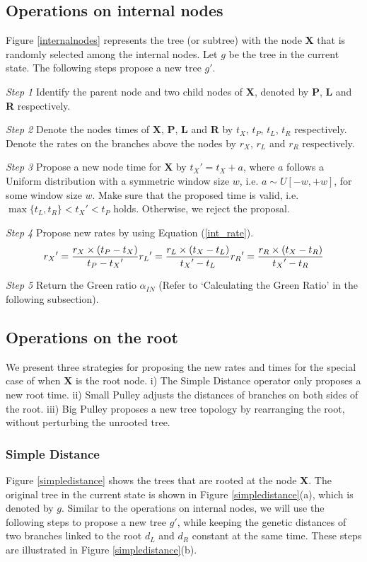 \documentclass{bmcart}
\begin{document}
\subsection*{Operations on internal nodes}
Figure \ref{internalnodes} represents the tree (or subtree) with the node \textbf{X} that is randomly selected among the internal nodes.  Let $g$ be the tree in the current state. The following steps propose a new tree ${g}'$.

\emph{Step 1} Identify the parent node and two child nodes of \textbf{X}, denoted by \textbf{P}, \textbf{L} and \textbf{R} respectively.

\emph{Step 2} Denote the nodes times of \textbf{X}, \textbf{P}, \textbf{L} and \textbf{R} by $t_X$, $t_P$, $t_L$, $t_R$ respectively. Denote the rates on the branches above the nodes by $r_X$, $r_L$ and $r_R$ respectively.

\emph{Step 3} Propose a new node time for \textbf{X} by ${t_X}' = {t_X} + a$, where $a$ follows a Uniform distribution with a symmetric window size $w$, i.e. $a \sim U[ - w, + w]$, for some window size $w$. Make sure that the proposed time is valid, i.e. $\max \{ {t_L},{t_R}\}  < {t_X}' < {t_P}$ holds. Otherwise, we reject the proposal.

\emph{Step 4} Propose new rates by using Equation (\ref{int_rate}).
\begin{equation}
 \label{int_rate}
{r_X}' = \frac{{r_X} \times ({{t_P} - {t_X}})}{{{t_P} - {t_X}'}}\\
{r_L}' = \frac{{{r_L} \times ({{t_X} - {t_L}})}}{{{t_X}' - {t_L}}}\\
{r_R}' = \frac{{{r_R} \times ({{t_X} - {t_R}})}}{{{t_X}' - {t_R}}}
 \end{equation}

\emph{Step 5} Return the Green ratio ${\alpha_{IN}}$ (Refer to `Calculating the Green Ratio' in the following subsection).
\subsection*{Operations on the root}
We present three strategies for proposing the new rates and times for the special case of when \textbf{X} is the root node. i) The Simple Distance operator only proposes a new root time. ii) Small Pulley adjusts the distances of branches on both sides of the root. iii) Big Pulley proposes a new tree topology by rearranging the root, without perturbing the unrooted tree.
\subsubsection*{Simple Distance}
Figure \ref{simpledistance} shows the trees that are rooted at the node \textbf{X}. The original tree in the current state is shown in Figure \ref{simpledistance}(a), which is denoted by $g$. Similar to the operations on internal nodes, we will use the following steps to propose a new tree ${g}'$, while keeping the genetic distances of two branches linked to the root $d_L$ and $d_R$ constant at the same time. These steps are illustrated in Figure \ref{simpledistance}(b).
\end{document}
